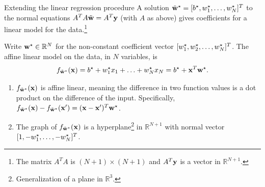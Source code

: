 \documentclass{beamer}
\theoremstyle{example}
\newcommand{\bb}[1]{\mathbb{#1}}
\begin{document}
\begin{frame}{Extending the linear regression procedure}
    A solution $\tilde{\bf w}^\star = [b^\star, w_1^\star, \ldots, w_N^\star]^T$ to the normal equations $A^TA\tilde{\bf w} = A^T{\bf y}$ (with $A$ as above) gives coefficients for a linear model for the data.\footnote{\small The matrix $A^TA$ is $(N+1)\times(N+1)$ and $A^T{\bf y}$ is a vector in $\bb R^{N+1}$.}

    \vspace*{-2pt}
    \pause
    Write ${\bf w}^\star \in \bb R^{N}$ for the non-constant coefficient vector ${\scriptsize [w_1^\star,w_2^\star,\ldots,w_N^\star]^T}$. The affine linear model on the data, in $N$ variables, is \vspace*{-4pt} 
    \[f_{\tilde{\bf w}^\star}({\bf x}) = b^\star + w_1^\star x_1 + \ldots + w_N^\star x_N = b^\star + {\bf x}^T{\bf w}^\star.\] 

    \vspace*{-15pt}   
    \begin{enumerate}
        \pause
        \item[(1)] $f_{\tilde{\bf w}^\star}({\bf x})$ is affine linear, meaning the difference in two function values is a dot product on the difference of the input. Specifically, $f_{\tilde{\bf w}^\star}({\bf x}) - f_{\tilde{\bf w}^\star}({\bf x}') = ({\bf x} - {\bf x}')^T{\bf w}^\star$.
        \pause
        \item[(2)] The graph of $f_{\tilde{\bf w}^\star}({\bf x})$ is a hyperplane\footnote{\small Generalization of a plane in $\bb R^3$.} in $\bb R^{N+1}$ with normal vector ${\scriptsize [1,-w_1^\star, \ldots, -w_N^\star]^T}$.
    \end{enumerate}
    \vfill
\end{frame}
\end{document}
